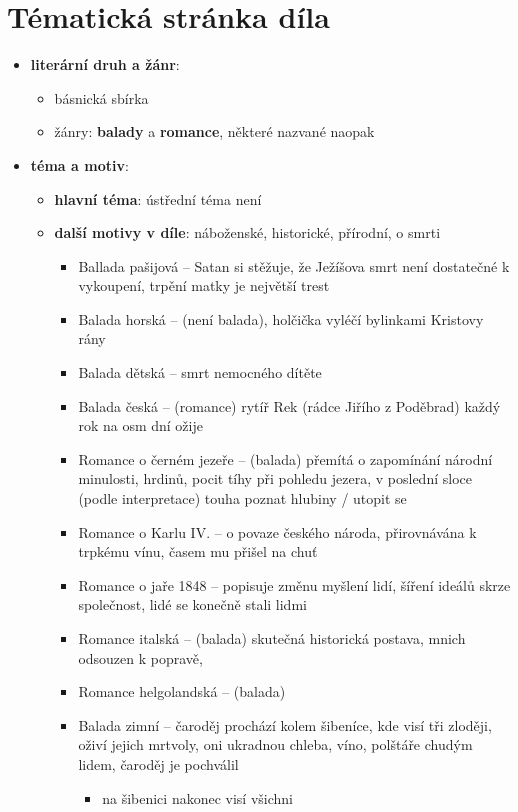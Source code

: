 \documentclass[10pt,a4paper]{article}
\begin{document}
\section*{Tématická stránka díla}
\begin{itemize}
\item \textbf{literární druh a žánr}:
	\begin{itemize}
	\item básnická sbírka
	\item žánry: \textbf{balady} a \textbf{romance}, některé nazvané naopak
	\end{itemize}
\item \textbf{téma a motiv}:
	\begin{itemize}
	\item \textbf{hlavní téma}: ústřední téma není
	\item \textbf{další motivy v díle}: náboženské, historické, přírodní, o smrti
		\begin{itemize}
		\item Ballada pašijová -- Satan si stěžuje, že Ježíšova smrt není dostatečné k vykoupení, trpění matky je největší trest
		\item Balada horská -- (není balada), holčička vyléčí bylinkami Kristovy rány
		\item Balada dětská -- smrt nemocného dítěte
		\item Balada česká -- (romance) rytíř Rek (rádce Jiřího z Poděbrad) každý rok na osm dní ožije
		\item Romance o černém jezeře -- (balada) přemítá o zapomínání národní minulosti, hrdinů, pocit tíhy při pohledu jezera, v poslední sloce (podle interpretace) touha poznat hlubiny / utopit se
		\item Romance o Karlu IV. -- o povaze českého národa, přirovnávána k trpkému vínu, časem mu přišel na chuť
		\item Romance o jaře 1848 -- popisuje změnu myšlení lidí, šíření ideálů skrze společnost, lidé se konečně stali lidmi
		\item Romance italská -- (balada) skutečná historická postava, mnich odsouzen k popravě, 
		\item Romance helgolandská -- (balada)
		\item Balada zimní -- čaroděj prochází kolem šibeníce, kde visí tři zloději, oživí jejich mrtvoly, oni ukradnou chleba, víno, polštáře chudým lidem, čaroděj je pochválil
			\begin{itemize}
			\item na šibenici nakonec visí všichni

\end{itemize}
\end{itemize}
\end{itemize}
\end{itemize}
\end{document}
